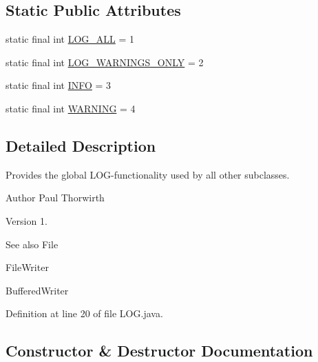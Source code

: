 \subsection*{Static Public Attributes}
\begin{DoxyCompactItemize}
\item 
static final int \hyperlink{classswp_1_1tuilmenau_1_1carduinodroid_1_1model_1_1_l_o_g_afff29e0c91f6559acbe2e9a26b523260}{L\+O\+G\+\_\+\+A\+L\+L} = 1
\item 
static final int \hyperlink{classswp_1_1tuilmenau_1_1carduinodroid_1_1model_1_1_l_o_g_a8b2cb22699bc53122a71cc3e579c515e}{L\+O\+G\+\_\+\+W\+A\+R\+N\+I\+N\+G\+S\+\_\+\+O\+N\+L\+Y} = 2
\item 
static final int \hyperlink{classswp_1_1tuilmenau_1_1carduinodroid_1_1model_1_1_l_o_g_a5a782d2e690478a0f5b8991711ff50be}{I\+N\+F\+O} = 3
\item 
static final int \hyperlink{classswp_1_1tuilmenau_1_1carduinodroid_1_1model_1_1_l_o_g_a533bd3ed6164b71fdb7c48a238207130}{W\+A\+R\+N\+I\+N\+G} = 4
\end{DoxyCompactItemize}


\subsection{Detailed Description}
Provides the global L\+O\+G-\/functionality used by all other subclasses.

\begin{DoxyAuthor}{Author}
Paul Thorwirth 
\end{DoxyAuthor}
\begin{DoxyVersion}{Version}
1. 
\end{DoxyVersion}
\begin{DoxySeeAlso}{See also}
File 

File\+Writer 

Buffered\+Writer 
\end{DoxySeeAlso}


Definition at line 20 of file L\+O\+G.\+java.



\subsection{Constructor \& Destructor Documentation}
\hypertarget{classswp_1_1tuilmenau_1_1carduinodroid_1_1model_1_1_l_o_g_a56023f651e46d2187d3103b08781c487}{}
